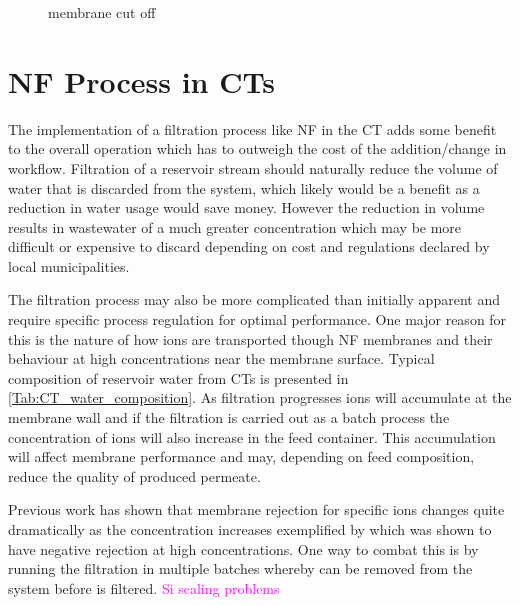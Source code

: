 \begin{figure}[H] %
	\centering
	
	\caption{ membrane cut off}
	\label{fig:membrane_values}
\end{figure}

\section{NF Process in CTs}


The implementation of a filtration process like NF in the CT adds some benefit to the overall operation which has to outweigh the cost of the addition/change in workflow.%
Filtration of a reservoir stream should naturally reduce the volume of water that is discarded from the system, which likely would be a benefit as a reduction in water usage would save money.
However the reduction in volume results in wastewater of a much greater concentration which may be more difficult or expensive to discard depending on cost and regulations declared by local municipalities.

The filtration process may also be more complicated than initially apparent and require specific process regulation for optimal performance.
One major reason for this is the nature of how ions are transported though NF membranes and their behaviour at high concentrations near the membrane surface.
Typical composition of reservoir water from CTs is presented in \cref{Tab:CT_water_composition}.
As filtration progresses ions will accumulate at the membrane wall and if the filtration is carried out as a batch process the concentration of ions will also increase in the feed container.
This accumulation will affect membrane performance and may, depending on feed composition, reduce the quality of produced permeate.%

Previous work  has shown that membrane rejection for specific ions changes quite dramatically as the concentration increases exemplified by  which was shown to have negative rejection at high  concentrations.
One way to combat this is by running the filtration in multiple batches whereby  can be removed from the system before  is filtered.
\textcolor{magenta}{Si scaling problems}




